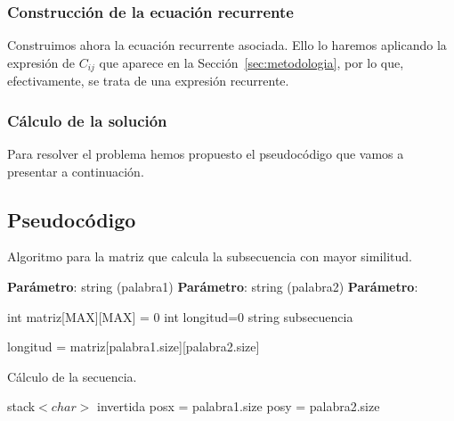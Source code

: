 \subsubsection{Construcción de la ecuación recurrente}

Construimos ahora la ecuación recurrente asociada. Ello lo haremos aplicando
la expresión de $C_{ij}$ que aparece en la Sección~\ref{sec:metodologia}, por lo
que, efectivamente, se trata de una expresión recurrente. 

\subsubsection{Cálculo de la solución}

Para resolver el problema hemos propuesto el pseudocódigo que vamos a presentar
a continuación. 

\subsection{Pseudocódigo}

\begin{algorithm}[H]
  \caption{Algoritmo para la matriz que calcula la subsecuencia con mayor similitud.}\label{alg:simil}
  \begin{minipage}{0.92\textwidth}
  \textbf{Parámetro}: string (palabra1)
  \textbf{Parámetro}: string (palabra2)
  \textbf{Parámetro}: 
  \end{minipage}

  int matriz[MAX][MAX] = {0}\;
  int longitud=0\;
  string subsecuencia\;

   {
     {
    }
  }

  longitud = matriz[palabra1.size][palabra2.size]\;  
\end{algorithm}

\begin{algorithm}[H]
  \caption{Cálculo de la secuencia.}

  stack$<char>$ invertida\;
  posx = palabra1.size\;
  posy = palabra2.size\;

\end{algorithm}


